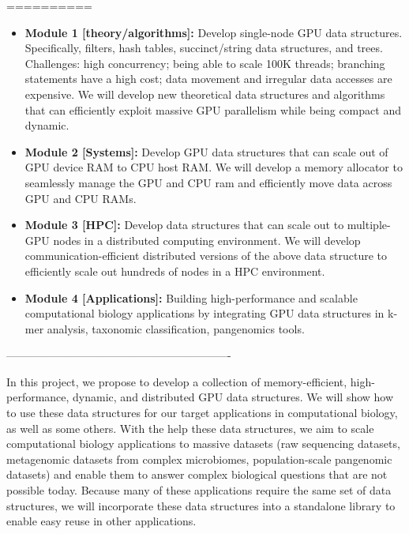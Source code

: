 


\iffalse
==========



\begin{itemize}[noitemsep, leftmargin=*]
  \item \textbf{Module 1 [theory/algorithms]:} Develop single-node GPU data structures.
    Specifically, filters, hash tables, succinct/string data structures, and
    trees. Challenges: high concurrency; being able to scale 100K threads;
    branching statements have a high cost; data movement and irregular data
    accesses are expensive. We will develop new theoretical data structures and
    algorithms that can efficiently exploit massive GPU parallelism while being
    compact and dynamic.

  \item \textbf{Module 2 [Systems]:} Develop GPU data structures that can scale out of
      GPU device RAM to CPU host RAM\@. We will develop a memory allocator to
      seamlessly manage the GPU and CPU ram and efficiently move data across GPU
      and CPU RAMs.

    \item \textbf{Module 3 [HPC]:} Develop data structures that can scale out to
      multiple-GPU nodes in a distributed computing environment. We will develop
      communication-efficient distributed versions of the above data structure
      to efficiently scale out hundreds of nodes in a HPC environment.

    \item \textbf{Module 4 [Applications]:} Building high-performance and scalable
      computational biology applications by integrating GPU data structures in
      k-mer analysis, taxonomic classification, pangenomics tools.

\end{itemize}

-------------------------------------------------------------

In this project, we propose to develop a  collection of
memory-efficient, high-performance, dynamic, and distributed GPU data structures.
We will show how to use these data structures for our target applications in computational biology, as well as some others.
With the help these data structures, we aim to scale computational biology applications to massive datasets (raw sequencing datasets, metagenomic datasets from complex microbiomes, population-scale pangenomic datasets) and enable them to answer complex biological questions that are not possible today.
Because many of these applications require the same set of data structures, we will incorporate these data structures into a standalone library to enable easy reuse in other applications.

